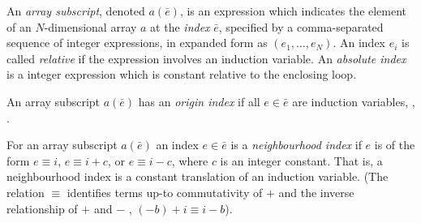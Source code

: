\begin{defn}\label{def:array-subs}
  An \emph{array subscript}, denoted $a(\bar{e})$, is an expression
  which indicates the element of an $N$-dimensional array $a$ at the
  \emph{index} $\bar{e}$, specified by a comma-separated sequence of
  integer expressions, in expanded form as $(e_1, \ldots, e_N)$. An
  index $e_i$ is called \emph{relative} if the expression involves an
  induction variable. An \emph{absolute index} is a integer expression
  which is constant relative to the enclosing loop.
\end{defn}

\begin{defn}[Origin]\label{def:origin}
  An array subscript $a(\bar{e})$ has an \emph{origin index} if
  all $e \in \bar{e}$ are induction variables, \eg{}, .
\end{defn}

\begin{defn}\label{def:neighbour-ix}
  For an array subscript $a(\bar{e})$ an index $e \in \bar{e}$ is a
  \emph{neighbourhood index} if $e$ is of the form $e \equiv i$, $e \equiv i +
  c$, or $e \equiv i - c$, where $c$ is an integer constant. That is, a
  neighbourhood index is a constant translation of an induction variable. (The
  relation $\equiv$ identifies terms up-to commutativity of $+$ and the inverse
  relationship of $+$ and $-$ \eg{}, $(-b) + i \equiv i - b$).
\end{defn}


